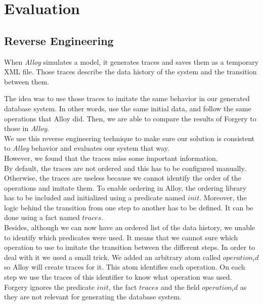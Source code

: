 \documentclass[oneside]{book}
\begin{document}
\newpage

\section{Evaluation}
\label{sec:evaluation}

\subsection{Reverse Engineering}
When \textit{Alloy} simulates a model, it generates traces and saves them as a temporary XML file. Those traces describe the data history of the system and the transition between them. 

The idea was to use those traces to imitate the same behavior in our generated database system. In other words, use the same initial data, and follow the same operations that Alloy did. Then, we are able to compare the results of Forgery to those in \textit{Alloy}.\\

We use this reverse engineering technique to make sure our solution is consistent to \textit{Alloy} behavior and evaluates our system that way.\\

However, we found that the traces miss some important information.\\ 

By default, the traces are not ordered and this has to be configured manually. Otherwise, the traces are useless because we cannot identify the order of the operations and imitate them. To enable ordering in Alloy, the ordering library has to be included and initialized using a predicate named $init$. Moreover, the logic behind the transition from one step to another has to be defined. It can be done using a fact named $traces$.\\ 

Besides, although we can now have an ordered list of the data history, we unable to identify which predicates were used. It means that we cannot sure which operation to use to imitate the transition between the different steps. In order to deal with it we used a small trick. We added an arbitrary atom called $operation_id$ so Alloy will create traces for it. This atom identifies each operation. On each step we use the traces of this identifier to know what operation was used.\\

Forgery ignores the predicate $init$, the fact $traces$ and the field $operation_id$ as they are not relevant for generating the database system.\\
\end{document}
